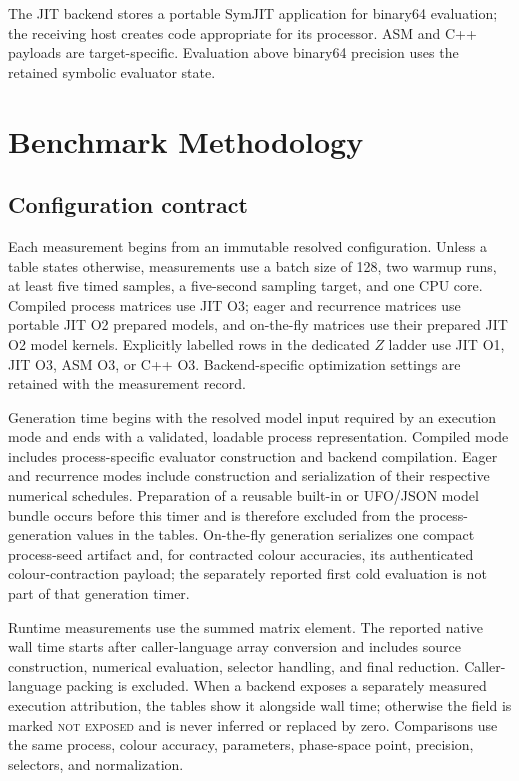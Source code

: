 \documentclass[10pt,letterpaper]{article}
\begin{document}
The JIT backend stores a portable SymJIT application for binary64 evaluation;
the receiving host creates code appropriate for its processor. ASM and C++
payloads are target-specific. Evaluation above binary64 precision uses the
retained symbolic evaluator state.

\section{Benchmark Methodology}

\subsection{Configuration contract}

Each measurement begins from an immutable resolved configuration. Unless a
table states otherwise, measurements use a batch size of 128, two warmup runs,
at least five timed samples, a five-second sampling target, and one CPU core.
Compiled process matrices use JIT O3; eager and recurrence matrices use
portable JIT O2 prepared models, and on-the-fly matrices use their prepared
JIT O2 model kernels. Explicitly labelled rows in the dedicated \(Z\) ladder
use JIT O1, JIT O3, ASM O3, or C++ O3. Backend-specific optimization settings
are retained with the measurement record.

Generation time begins with the resolved model input required by an execution
mode and ends with a validated, loadable process representation. Compiled mode
includes process-specific evaluator construction and backend compilation.
Eager and recurrence modes include construction and serialization of their
respective numerical schedules. Preparation of a reusable built-in or UFO/JSON
model bundle occurs before this timer and is therefore excluded from the
process-generation values in the tables. On-the-fly generation serializes one
compact process-seed artifact and, for contracted colour accuracies, its
authenticated colour-contraction payload; the separately reported first cold
evaluation is not part of that generation timer.

Runtime measurements use the summed matrix element. The reported native wall
time starts after caller-language array conversion and includes source
construction, numerical evaluation, selector handling, and final reduction.
Caller-language packing is excluded. When a backend exposes a separately
measured execution attribution, the tables show it alongside wall time;
otherwise the field is marked \textsc{not exposed} and is never inferred or
replaced by zero. Comparisons use the same process, colour accuracy,
parameters, phase-space point, precision, selectors, and normalization.
\end{document}

